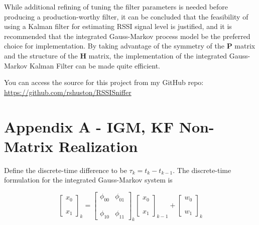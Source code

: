 \documentclass[12pt]{article}
\begin{document}
\clearpage

While additional refining of tuning the filter parameters is needed before producing a
production-worthy filter, it can be concluded that the feasibility of using a Kalman
filter for estimating RSSI signal level is justified, and it is recommended that the
integrated Gauss-Markov process model be the preferred choice for implementation. By
taking advantage of the symmetry of the $\mathbf{P}$ matrix and the structure of the
$\mathbf{H}$ matrix, the implementation of the integrated Gauss-Markov Kalman Filter
can be made quite efficient.

You can access the source for this project from my GitHub repo: \\
\textcolor{blue}{\url{https://github.com/rshuston/RSSISniffer}}



%
%

\clearpage
\section{Appendix A - IGM, KF Non-Matrix Realization}

Define the discrete-time difference to be $\tau_k = t_k - t_{k-1}$. The discrete-time
formulation for the integrated Gauss-Markov system is

\begin{equation*}
    \begin{bmatrix}
    x_0 \\
    \phantom{m} \\
    x_1
    \end{bmatrix}_k
    =
    \begin{bmatrix}
    \phi_{00} & \phi_{01} \\
    \phantom{m} \\
    \phi_{10} & \phi_{11}
    \end{bmatrix}_k
    \begin{bmatrix}
    x_0 \\
    \phantom{m} \\
    x_1
    \end{bmatrix}_{k-1}
    +
    \begin{bmatrix}
    w_0 \\
    \phantom{m} \\
    w_1
    \end{bmatrix}_{k}
\end{equation*}
\end{document}
